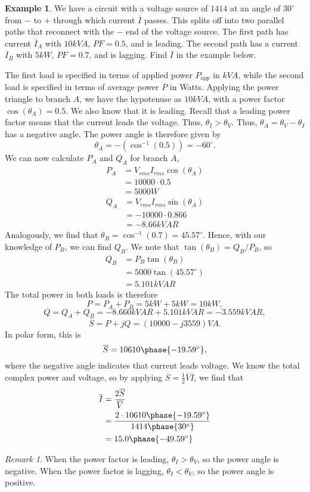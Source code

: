 \documentclass[11pt]{article}
\theoremstyle{plain} %
\theoremstyle{definition}
\theoremstyle{example}
\newtheorem*{example}{Example}
\theoremstyle{remark}
\newtheorem*{remark}{Remark}
\newcommand{\degree}{^{\circ}}
\begin{document}
\begin{example}
We have a circuit with a voltage source of $1414$ at an angle of $30\degree$ from $-$ to $+$ through which current $\overline I$ passes. This splits off into two parallel paths that reconnect with the $-$ end of the voltage source. The first path has current $\overline I_A$ with $10kVA$, $PF=0.5$, and is leading. The second path has a current $\overline I_B$ with $5kW$, $PF=0.7$, and is lagging. Find $\overline I$ in the example below.
\end{example}
The first load is specified in terms of applied power $P_{app}$ in $kVA$, while the second load is specified in terms of average power $P$ in Watts. Applying the power triangle to branch $A$, we have the hypotenuse as $10kVA$, with a power factor $\cos(\theta_A) = 0.5$. We also know that it is leading. Recall that a leading power factor means that the current leads the voltage. Thus, $\theta_I>\theta_V$. Thus, $\theta_A = \theta_V-\theta_I$ has a negative angle. The power angle is therefore given by 
$$\theta_A = -\left(\cos^{-1}(0.5)\right) = -60 \degree.$$
We can now calculate $P_A$ and $Q_A$ for branch $A$, 
\begin{align*}
	P_A &= V_{rms}I_{rms}\cos(\theta_A)\\
	&= 10000\cdot 0.5\\
	&= 5000W
\end{align*}
\begin{align*}
	Q_A &= V_{rms}I_{rms}\sin(\theta_A)\\
	&= -10000\cdot 0.866\\
	&= -8.66kVAR
\end{align*}
Analogously, we find that $\theta_B = \cos^{-1}(0.7) = 45.57\degree$. Hence, with our knowledge of $P_B$, we can find $Q_B$. We note that $\tan(\theta_B) = Q_B/P_B$, so 
\begin{align*}
	Q_B &= P_B\tan(\theta_B)\\
	&= 5000\tan\left(45.57\degree\right)\\
	&= 5.101kVAR
\end{align*}
The total power in both loads is therefore 
$$P = P_A+P_B = 5kW + 5kW = 10kW,$$
$$Q = Q_A+Q_B = -8.660 kVAR + 5.101kVAR = -3.559kVAR,$$
$$\overline{S} = P+jQ = (10000-j3559)VA.$$
In polar form, this is 
$$\overline S = 10610 \phase{-19.59\degree},$$
where the negative angle indicates that current leads voltage. We know the total complex power and voltage, so by applying $\overline S = \frac{1}{2}\overline V\overline I$, we find that
\begin{align*}
	\overline I &= \frac{2\overline S}{\overline V}\\
	&= \frac{2\cdot 10610\phase{-19.59\degree}}{1414\phase{30\degree}}\\
	&= 15.0\phase{-49.59\degree}
\end{align*}
\begin{remark}
When the power factor is leading, $\theta_I>\theta_V$, so the power angle is negative. When the power factor is lagging, $\theta_I<\theta_V$, so the power angle is positive. 
\end{remark}
\end{document}
